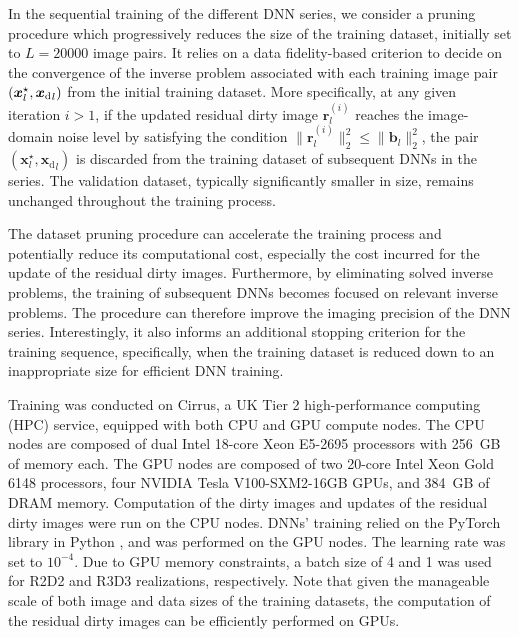 \documentclass[preprint2,twocolumn]{aastex631}
\newcommand{\xb}{\ensuremath{\boldsymbol{x}}}
\newcommand{\rb}{\ensuremath{\boldsymbol{r}}}
\newcommand{\bb}{\ensuremath{\boldsymbol{{b}}}}
\begin{document}
In the sequential training of the different DNN series, we consider a pruning procedure which progressively reduces the size of the training dataset, initially set to $L=20000$ image pairs. It relies on a data fidelity-based criterion to decide on the convergence of the inverse problem associated with each training image pair $(\xb^\star_l,{\xb_{\textrm d}}_l)$ from the initial training dataset. More specifically, at any given iteration $i>1$, if the updated residual dirty image ${\rb^{(i)}_l}$ reaches the image-domain noise level by satisfying the condition $\| \rb_l^{(i)} \|^2_2 \leq \| \bb_l \|^2_2$, the pair $(\xb^\star_l,{\xb_{\textrm{d}}}_l)$ is discarded from the training dataset of subsequent DNNs in the series. The validation dataset, typically significantly smaller in size, remains unchanged throughout the training process.

The dataset pruning procedure can accelerate the training process and potentially reduce its computational cost, especially the cost incurred for the update of the residual dirty images. Furthermore, by eliminating solved inverse problems, the training of subsequent DNNs becomes focused on relevant inverse problems. The procedure can therefore improve the imaging precision of the DNN series. Interestingly, it also informs an additional stopping criterion for the training sequence, specifically, when the training dataset is reduced down to an inappropriate size for efficient DNN training. 

Training was conducted on Cirrus, a UK Tier 2 high-performance computing (HPC) service, equipped with both CPU and GPU compute nodes. The CPU nodes are composed of dual Intel 18-core Xeon E5-2695 processors with 256~GB of memory each. The GPU nodes are composed of two 20-core Intel Xeon Gold 6148 processors, four NVIDIA Tesla V100-SXM2-16GB GPUs, and 384~GB of DRAM memory. Computation of the dirty images and updates of the residual dirty images were run on the CPU nodes. DNNs' training relied on the PyTorch library in Python \citep{paszke2019pytorch}, and was performed on the GPU nodes. The learning rate was set to $10^{-4}$. Due to GPU memory constraints, a batch size of 4 and 1 was used for R2D2 and R3D3 realizations, respectively. Note that given the manageable scale of both image and data sizes of the training datasets, the computation of the residual dirty images can be efficiently performed on GPUs.
\end{document}
